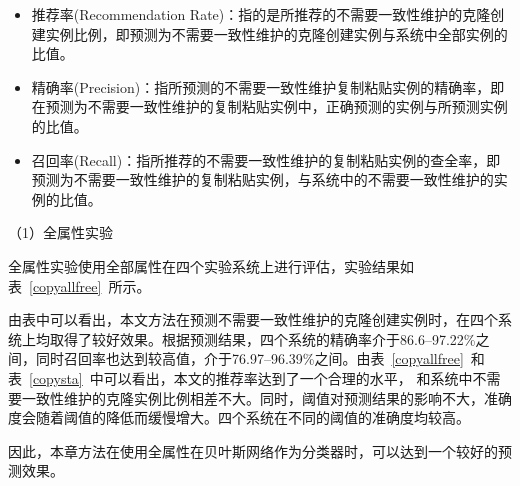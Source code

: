 \begin{itemize}
\item	
推荐率(Recommendation Rate)：指的是所推荐的不需要一致性维护的克隆创建实例比例，即预测为不需要一致性维护的克隆创建实例与系统中全部实例的比值。
\item  
精确率(Precision)：指所预测的不需要一致性维护复制粘贴实例的精确率，即在预测为不需要一致性维护的复制粘贴实例中，正确预测的实例与所预测实例的比值。
\item  
召回率(Recall)：指所推荐的不需要一致性维护的复制粘贴实例的查全率，即预测为不需要一致性维护的复制粘贴实例，与系统中的不需要一致性维护的实例的比值。
\end{itemize}

（1）全属性实验

全属性实验使用全部属性在四个实验系统上进行评估，实验结果如表~\ref{copyallfree}~所示。

由表中可以看出，本文方法在预测不需要一致性维护的克隆创建实例时，在四个系统上均取得了较好效果。根据预测结果，四个系统的精确率介于86.6--97.22\%之间，同时召回率也达到较高值，介于76.97--96.39\%之间。由表~\ref{copyallfree}~和表~\ref{copysta}~中可以看出，本文的推荐率达到了一个合理的水平， 和系统中不需要一致性维护的克隆实例比例相差不大。同时，阈值对预测结果的影响不大，准确度会随着阈值的降低而缓慢增大。四个系统在不同的阈值的准确度均较高。


因此，本章方法在使用全属性在贝叶斯网络作为分类器时，可以达到一个较好的预测效果。

